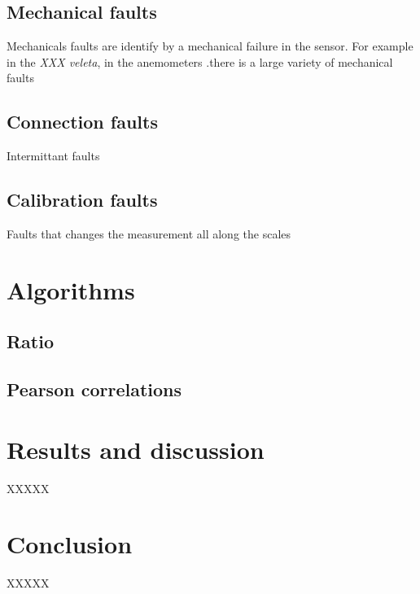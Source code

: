 \documentclass[journal]{IEEEtran}
\begin{document}
\subsection{Mechanical faults} Mechanicals faults are identify by a mechanical failure in the sensor. For example in the \emph{XXX veleta}, 
in the anemometers .there is a large variety of mechanical faults
\subsection{Connection  faults} Intermittant faults
\subsection{Calibration faults} Faults that changes the measurement all along the scales


\section{Algorithms}
\subsection{Ratio}
\subsection{Pearson correlations}
\section{Results and discussion}
XXXXX
\section{Conclusion}
XXXXX



\end{document}
